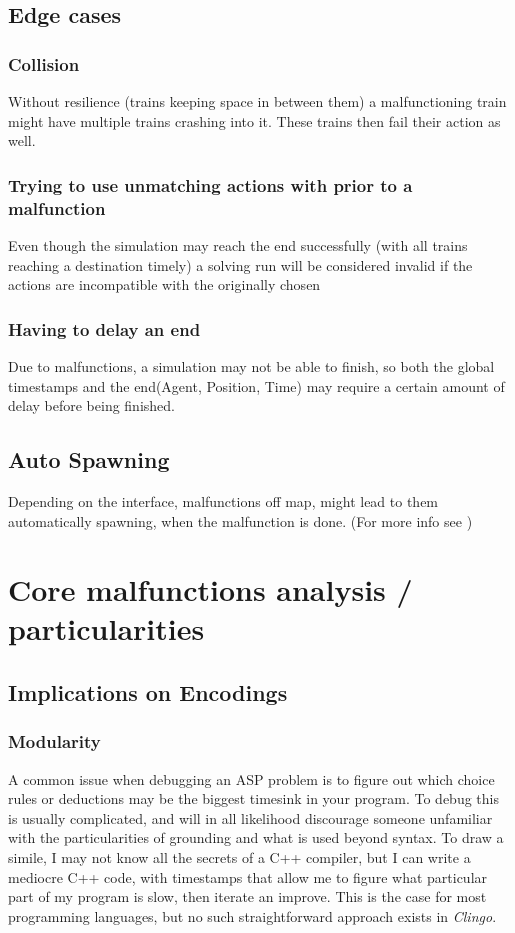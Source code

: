 \subsection{Edge cases}

\subsubsection {Collision} Without resilience (trains keeping space in between them) a malfunctioning train might have multiple trains crashing into it. These trains then fail their action as well.

\subsubsection {Trying to use unmatching actions with prior to a malfunction} Even though the simulation may reach the end successfully (with all trains reaching a destination timely) a solving run will be considered invalid if the actions are incompatible with the originally chosen

\subsubsection {Having to delay an end} Due to malfunctions, a simulation may not be able to finish, so both the global timestamps and the end(Agent, Position, Time) may require a certain amount of delay before being finished.

\subsection {Auto Spawning} Depending on the interface, malfunctions off map, might lead to them automatically spawning, when the malfunction is done. (For more info see \cite{malfunction_issue})

\section{Core malfunctions analysis / particularities}
\subsection{Implications on Encodings}

\subsubsection{Modularity}
A common issue when debugging an ASP problem is to figure out which choice rules or deductions may be the biggest timesink in your program. To debug this is usually complicated, and will in all likelihood discourage someone unfamiliar with the particularities of grounding and what is used beyond syntax. To draw a simile, I may not know all the secrets of a C++ compiler, but I can write a mediocre C++ code, with timestamps that allow me to figure what particular part of my program is slow, then iterate an improve. This is the case for most programming languages, but no such straightforward approach exists in \textit{Clingo}.

